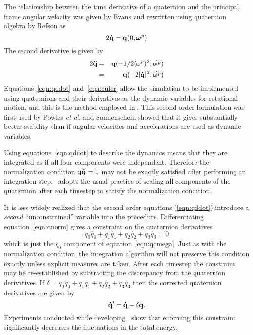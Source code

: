 The relationship between the time derivative of a quaternion and the
principal frame angular velocity was given by Evans\cite[Equation
27]{evans:77} and rewritten using quaternion algebra by 
Refson\cite{refson:87a} as
\begin{equation}
2 {\bf \dot{q}} = {\bf q}(0,\mbox{\boldmath \protect\(\omega\protect\)}^p)
\label{eqn:qomega}
\end{equation}
The second derivative is given by
\begin{eqnarray}
\nonumber
2{\bf \ddot{q}} & = & {\bf q}(- 1/2 (\omega^p)^2,\dot{\mbox{\boldmath \protect\(\omega\protect\)}^p}) \\
 & = & {\bf q}(-2 |{\bf \dot{q}}|^2,\dot{\mbox{\boldmath \protect\(\omega\protect\)}^p})
\label{eqn:qddot}
\end{eqnarray}
Equations~\ref{eqn:qddot} and~\ref{eqn:euler} allow the simulation to
be implemented using quaternions and their derivatives as the dynamic
variables for rotational motion, and this is the method employed in
\moldy.  This second order formulation was first used by Powles {\em et
al}.\cite{powles:79} and Sonnenschein showed\cite{sonnenschein:85}
that it gives substantially better stability than if angular
velocities and accelerations are used as dynamic variables.
 
Using equations~\ref{eqn:qddot} to describe the dynamics means that
they are integrated as if all four components were independent.
Therefore the normalization condition $\bf q \tilde{q} = 1$ may not be
exactly satisfied after performing an integration step.  \moldy\
adopts the usual practice of scaling all components of the quaternion
after each timestep to satisfy the normalization condition\cite{evans:77b}.

It is less widely realized that the second order equations
(\ref{eqn:qddot}) introduce a {\em second} ``unconstrained'' variable
into the procedure.  Differentiating equation~\ref{eqn:qnorm} gives a
constraint on the quaternion derivatives
\begin{equation}
q_0\dot{q_0} + q_1\dot{q_1} + q_2\dot{q_2} + q_3\dot{q_3} = 0
\label{eqn:qconst} 
\end{equation}
which is just the $q_0$ component of equation~\ref{eqn:qomega}.
Just as with the normalization condition, the integration algorithm
will not preserve this condition exactly unless explicit measures are
taken.  After each timestep the constraint may be re-established by
subtracting the discrepancy from the quaternion derivatives.  If
$\delta = q_0\dot{q_0} + q_1\dot{q_1} + q_2\dot{q_2} + q_3\dot{q_3}$
then the corrected quaternion derivatives are given by
\begin{equation}
{\bf \dot{q}^\prime } =  {\bf \dot{q}} - \delta {\bf q}.
\label{eqn:qconcorr}
\end{equation}
Experiments conducted while developing \moldy\ show that enforcing
this constraint significantly decreases the fluctuations in the total
energy. 

